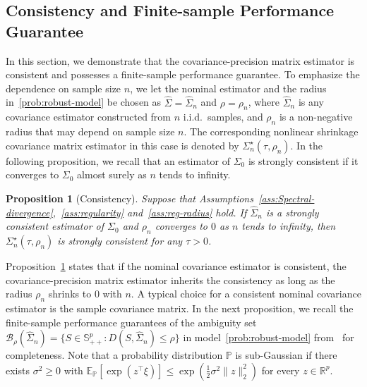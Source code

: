 \documentclass[11pt]{article}
\def\P{\mathbb{P}}
\def\R{\mathbb{R}}
\def\S{\mathbb{S}}
\newtheorem{proposition}{Proposition}
\newcommand{\opt}{^\star}
\def\transpose{\top}
\def\P{\mathbb{P}}
\def\R{\mathbb{R}}
\def\S{\mathbb{S}}
\def\E {\mathbb{E}}
\def\PD{{\S^p_{++}}}
\newcommand{\wh}{\widehat}
\begin{document}
\subsection{Consistency and Finite-sample Performance Guarantee}

In this section, we demonstrate that the covariance-precision matrix estimator is consistent and possesses a finite-sample performance guarantee. To emphasize the dependence on sample size $n$, we let the nominal estimator and the radius in~\eqref{prob:robust-model} be chosen as $\wh\Sigma=\wh\Sigma_n$ and $ \rho= \rho_n$, where $\wh\Sigma_n$ is any covariance estimator constructed from $n$ i.i.d.~samples, and $ \rho_n$ is a non-negative radius that may depend on sample size $n$. The corresponding nonlinear shrinkage covariance matrix estimator in this case is denoted by $\Sigma\opt_n(\tau, \rho_n)$. In the following proposition, we recall that an estimator of $\Sigma_0$ is strongly consistent if it converges to $\Sigma_0$ almost surely as $n$ tends to infinity.

\begin{proposition}[Consistency]\label{prop:consistency}
    Suppose that Assumptions~\ref{ass:Spectral-divergence},~\ref{ass:regularity} and~\ref{ass:reg-radius} hold. If $\wh\Sigma_n$ is a strongly consistent estimator of $\Sigma_0$ and $ \rho_n$ converges to $0$ as $n$ tends to infinity, then $\Sigma\opt_n(\tau, \rho_n)$ is strongly consistent for any $\tau>0$.
\end{proposition}

Proposition~\ref{prop:consistency} states that if the nominal covariance estimator is consistent, the covariance-precision matrix estimator inherits the consistency as long as the radius $ \rho_n$ shrinks to $0$ with $n$. A typical choice for a consistent nominal covariance estimator is the sample covariance matrix. In the next proposition, we recall the finite-sample performance guarantees of the ambiguity set $\mathcal{B}_{ \rho}(\wh\Sigma_n)=\{S\in\PD:D(S,\wh\Sigma_n)\leq  \rho\}$ in model~\eqref{prob:robust-model} from~\citet[Proposition 8]{ref:yue2024geometric} for completeness. Note that a probability distribution $\mathbb{P}$ is sub-Gaussian if there exists $\sigma^2\geq 0$ with $\E_{\P}[\exp(z^\transpose\xi)]\leq \exp(\frac{1}{2}\sigma^2\|z\|_2^2)$ for every $z\in\R^p$.
\end{document}
